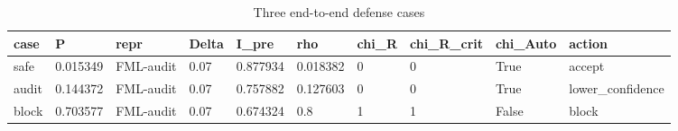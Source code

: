 \begin{table}[h]
\centering
\caption{Three end-to-end defense cases}
\label{tab:defense\_cases}
\begin{tabular}{|l|l|l|l|l|l|l|l|l|l|}
\hline
case & P & repr & Delta & I\_pre & rho & chi\_R & chi\_R\_crit & chi\_Auto & action \\
\hline
safe & 0.015349 & FML-audit & 0.07 & 0.877934 & 0.018382 & 0 & 0 & True & accept \\
\hline
audit & 0.144372 & FML-audit & 0.07 & 0.757882 & 0.127603 & 0 & 0 & True & lower\_confidence \\
\hline
block & 0.703577 & FML-audit & 0.07 & 0.674324 & 0.8 & 1 & 1 & False & block \\
\hline
\end{tabular}
\end{table}
